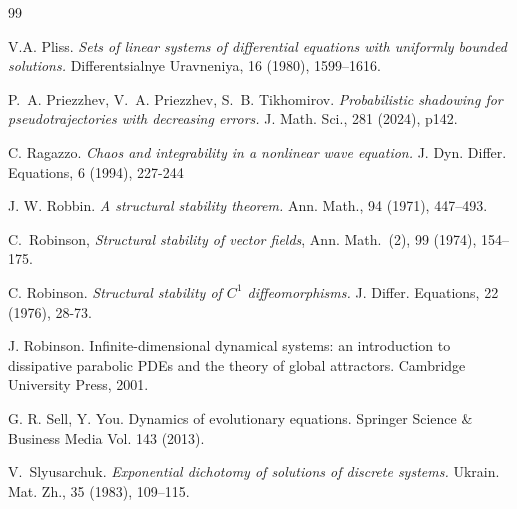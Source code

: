 \documentclass[12pt]{article}
\theoremstyle{definition}
\begin{document}
\begin{thebibliography}{99}
{ V.A. Pliss. \textit{Sets of linear systems of differential equations with uniformly bounded solutions.} Differentsialnye Uravneniya, 16 (1980), 1599–1616.


P.~A. Priezzhev, V.~A. Priezzhev, S.~B. Tikhomirov.
\newblock \textit{Probabilistic shadowing for pseudotrajectories with decreasing errors.}
\newblock J. Math. Sci., 281 (2024), p142.

C. Ragazzo.
\textit{Chaos and integrability in a nonlinear wave equation.}
J. Dyn. Differ. Equations, 6 (1994), 227-244

 J. W. Robbin. \textit{A structural stability theorem.} Ann. Math., 94 (1971), 447–493.

C.~Robinson, \emph{Structural stability of vector fields}, Ann. Math.~(2), 99 (1974), 154--175. 

 C. Robinson. \textit{Structural stability of $C^{1}$ diffeomorphisms.} 
J. Differ. Equations, 22 (1976), 28-73.

J. Robinson. Infinite-dimensional dynamical systems: an introduction to dissipative parabolic PDEs and the theory of global attractors. Cambridge University Press, 2001.




 G. R. Sell, Y. You. Dynamics of evolutionary equations. Springer Science \& Business Media Vol. 143 (2013).

V.~Slyusarchuk.
\newblock \textit{Exponential dichotomy of solutions of discrete systems.}
\newblock Ukrain. Mat. Zh., 35 (1983), 109--115.


}
\end{thebibliography}
\end{document}
